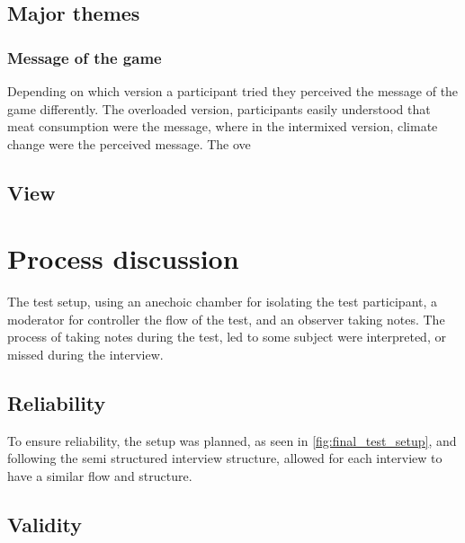     \subsection{Major themes}
     \subsubsection*{Message of the game}
     Depending on which version a participant tried they perceived the message of the game differently. The overloaded version, participants easily understood that meat consumption were the message, where in the intermixed version, climate change were the perceived message. The ove
     
     \subsection{View}
     
\section{Process discussion}
    The test setup, using an anechoic chamber for isolating the test participant, a moderator for controller the flow of the test, and an observer taking notes. The process of taking notes during the test, led to some subject were interpreted, or missed during the interview.
    
    \subsection{Reliability}
        To ensure reliability, the setup was planned, as seen in \autoref{fig:final_test_setup}, and following the semi structured interview structure, allowed for each interview to have a similar flow and structure.
    \subsection{Validity}
        